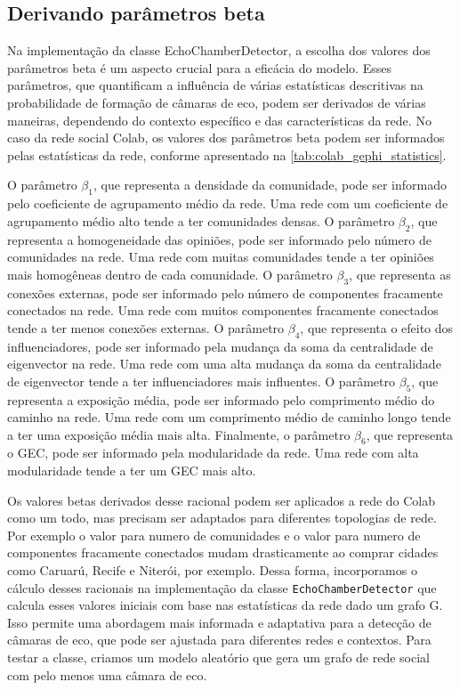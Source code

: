 \subsection{Derivando parâmetros beta}

Na implementação da classe EchoChamberDetector, a escolha dos valores dos parâmetros beta é um aspecto crucial para a eficácia do modelo. Esses parâmetros, que quantificam a influência de várias estatísticas descritivas na probabilidade de formação de câmaras de eco, podem ser derivados de várias maneiras, dependendo do contexto específico e das características da rede. No caso da rede social Colab, os valores dos parâmetros beta podem ser informados pelas estatísticas da rede, conforme apresentado na \autoref{tab:colab_gephi_statistics}.

O parâmetro $\beta_1$, que representa a densidade da comunidade, pode ser informado pelo coeficiente de agrupamento médio da rede. Uma rede com um coeficiente de agrupamento médio alto tende a ter comunidades densas. O parâmetro $\beta_2$, que representa a homogeneidade das opiniões, pode ser informado pelo número de comunidades na rede. Uma rede com muitas comunidades tende a ter opiniões mais homogêneas dentro de cada comunidade. O parâmetro $\beta_3$, que representa as conexões externas, pode ser informado pelo número de componentes fracamente conectados na rede. Uma rede com muitos componentes fracamente conectados tende a ter menos conexões externas. O parâmetro $\beta_4$, que representa o efeito dos influenciadores, pode ser informado pela mudança da soma da centralidade de eigenvector na rede. Uma rede com uma alta mudança da soma da centralidade de eigenvector tende a ter influenciadores mais influentes. O parâmetro $\beta_5$, que representa a exposição média, pode ser informado pelo comprimento médio do caminho na rede. Uma rede com um comprimento médio de caminho longo tende a ter uma exposição média mais alta. Finalmente, o parâmetro $\beta_6$, que representa o GEC, pode ser informado pela modularidade da rede. Uma rede com alta modularidade tende a ter um GEC mais alto.

Os valores betas derivados desse racional podem ser aplicados a rede do Colab como um todo, mas precisam ser adaptados para diferentes topologias de rede. Por exemplo o valor para numero de comunidades e o valor para numero de componentes fracamente conectados mudam drasticamente ao comprar cidades como Caruarú, Recife e Niterói, por exemplo. Dessa forma, incorporamos o cálculo desses racionais na implementação da classe \texttt{EchoChamberDetector} que calcula esses valores iniciais com base nas estatísticas da rede dado um grafo G. Isso permite uma abordagem mais informada e adaptativa para a detecção de câmaras de eco, que pode ser ajustada para diferentes redes e contextos. Para testar a classe, criamos um modelo aleatório que gera um grafo de rede social com pelo menos uma câmara de eco.

